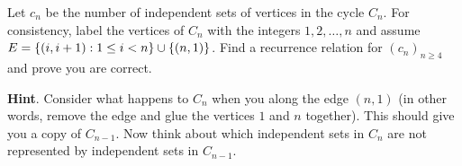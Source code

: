 \documentclass{book}
\begin{document}
\setcounter{cpjt}{140}
\addtocounter{cpjt}{-1}
\begin{activity}\label{activity-133}
\hypertarget{p-911}{}%
Let \(c_n\) be the number of independent sets of vertices in the cycle \(C_n\).  For consistency, label the vertices of \(C_n\) with the integers \(1, 2, \ldots, n\) and assume \(E = \{(i, i+1) : 1 \le i < n\} \cup \{(n, 1)\}\). Find a recurrence relation for \((c_n)_{n\ge 4}\) and prove you are correct.%
\par\smallskip%
\noindent\textbf{Hint}.\hypertarget{hint-99}{}\quad%
\hypertarget{p-912}{}%
Consider what happens to \(C_n\) when you  along the edge \((n,1)\) (in other words, remove the edge and glue the vertices \(1\) and \(n\) together).  This should give you a copy of \(C_{n-1}\).  Now think about which independent sets in \(C_n\) are not represented by independent sets in \(C_{n-1}\).%
\end{activity}

\clearpage
\end{document}
